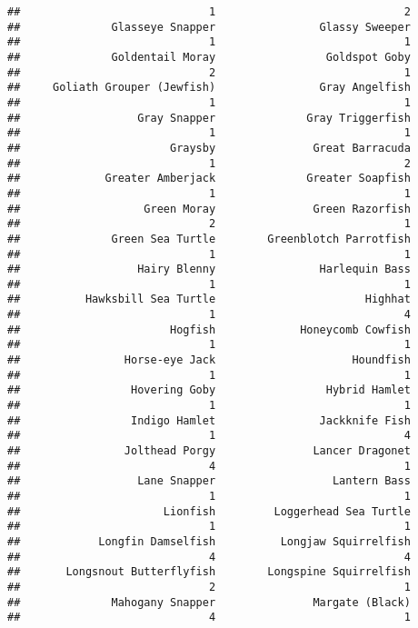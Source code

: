 \documentclass[
]{article}
\begin{document}
\begin{verbatim}
##                             1                             2 
##              Glasseye Snapper                Glassy Sweeper 
##                             1                             1 
##              Goldentail Moray                 Goldspot Goby 
##                             2                             1 
##     Goliath Grouper (Jewfish)                Gray Angelfish 
##                             1                             1 
##                  Gray Snapper              Gray Triggerfish 
##                             1                             1 
##                       Graysby               Great Barracuda 
##                             1                             2 
##             Greater Amberjack              Greater Soapfish 
##                             1                             1 
##                   Green Moray               Green Razorfish 
##                             2                             1 
##              Green Sea Turtle        Greenblotch Parrotfish 
##                             1                             1 
##                  Hairy Blenny                Harlequin Bass 
##                             1                             1 
##          Hawksbill Sea Turtle                       Highhat 
##                             1                             4 
##                       Hogfish             Honeycomb Cowfish 
##                             1                             1 
##                Horse-eye Jack                     Houndfish 
##                             1                             1 
##                 Hovering Goby                 Hybrid Hamlet 
##                             1                             1 
##                 Indigo Hamlet                Jackknife Fish 
##                             1                             4 
##                Jolthead Porgy               Lancer Dragonet 
##                             4                             1 
##                  Lane Snapper                  Lantern Bass 
##                             1                             1 
##                      Lionfish         Loggerhead Sea Turtle 
##                             1                             1 
##            Longfin Damselfish          Longjaw Squirrelfish 
##                             4                             4 
##       Longsnout Butterflyfish        Longspine Squirrelfish 
##                             2                             1 
##              Mahogany Snapper               Margate (Black) 
##                             4                             1 

\end{verbatim}
\end{document}
